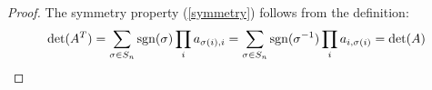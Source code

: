 \begin{proof}
%
%	
%	
	
	The symmetry property (\ref{symmetry}) follows from the definition:
	$$\det(A^T) = \sum_{\sigma \in S_n} \operatorname{sgn}(\sigma) \prod_i a_{\sigma(i),i}= \sum_{\sigma \in S_n} \operatorname{sgn}(\sigma^{-1}) \prod_i a_{i,\sigma(i)} = \det(A)$$
	

\end{proof}
